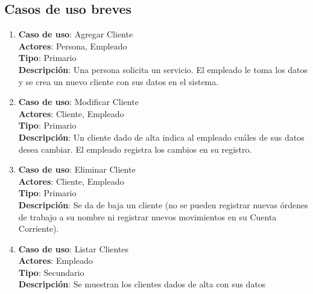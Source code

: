 \documentclass[12pt]{extarticle}
\begin{document}
\begin{spacing}{1.2}
        \subsection{Casos de uso breves}


        \begin{enumerate}



            \subsubsection{Clientes}



            \item 	\textbf{Caso de uso}: Agregar Cliente\\
                    \textbf{Actores}: Persona, Empleado\\
                    \textbf{Tipo}: Primario\\
                    \textbf{Descripción}: Una persona solicita un servicio. El empleado le toma los datos y se crea un nuevo cliente con sus datos en el sistema.

            \item 	\textbf{Caso de uso}: Modificar Cliente\\
                    \textbf{Actores}: Cliente, Empleado\\
                    \textbf{Tipo}: Primario\\
                    \textbf{Descripción}: Un cliente dado de alta indica al empleado cuáles de sus datos desea cambiar. El empleado registra los cambios en su registro.

            \item 	\textbf{Caso de uso}: Eliminar Cliente\\
                    \textbf{Actores}: Cliente, Empleado\\
                    \textbf{Tipo}: Primario\\
                    \textbf{Descripción}: Se da de baja un cliente (no se pueden registrar nuevas órdenes de trabajo a su nombre ni registrar nuevos movimientos en su Cuenta Corriente).

            \item 	\textbf{Caso de uso}: Listar Clientes\\
                    \textbf{Actores}: Empleado\\
                    \textbf{Tipo}: Secundario\\
                    \textbf{Descripción}: Se muestran los clientes dados de alta con sus datos


\end{enumerate}
\end{spacing}
\end{document}

